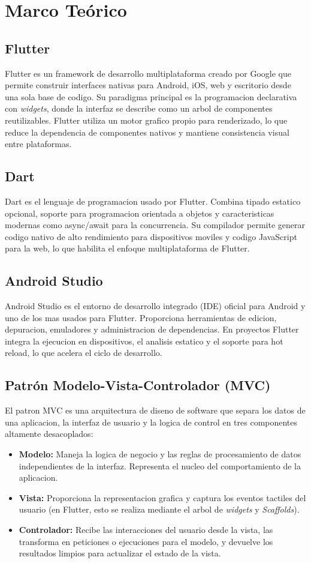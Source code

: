 \documentclass[12pt, a4paper]{article}
\begin{document}
\section{Marco Teórico}

\subsection{Flutter}
Flutter es un framework de desarrollo multiplataforma creado por Google que permite construir interfaces nativas para Android, iOS, web y escritorio desde una sola base de codigo. Su paradigma principal es la programacion declarativa con \textit{widgets}, donde la interfaz se describe como un arbol de componentes reutilizables. Flutter utiliza un motor grafico propio para renderizado, lo que reduce la dependencia de componentes nativos y mantiene consistencia visual entre plataformas.

\subsection{Dart}
Dart es el lenguaje de programacion usado por Flutter. Combina tipado estatico opcional, soporte para programacion orientada a objetos y caracteristicas modernas como async/await para la concurrencia. Su compilador permite generar codigo nativo de alto rendimiento para dispositivos moviles y codigo JavaScript para la web, lo que habilita el enfoque multiplataforma de Flutter.

\subsection{Android Studio}
Android Studio es el entorno de desarrollo integrado (IDE) oficial para Android y uno de los mas usados para Flutter. Proporciona herramientas de edicion, depuracion, emuladores y administracion de dependencias. En proyectos Flutter integra la ejecucion en dispositivos, el analisis estatico y el soporte para hot reload, lo que acelera el ciclo de desarrollo.

\subsection{Patrón Modelo-Vista-Controlador (MVC)}
El patron MVC es una arquitectura de diseno de software que separa los datos de una aplicacion, la interfaz de usuario y la logica de control en tres componentes altamente desacoplados:
\begin{itemize}
  \item \textbf{Modelo:} Maneja la logica de negocio y las reglas de procesamiento de datos independientes de la interfaz. Representa el nucleo del comportamiento de la aplicacion.
  \item \textbf{Vista:} Proporciona la representacion grafica y captura los eventos tactiles del usuario (en Flutter, esto se realiza mediante el arbol de \textit{widgets} y \textit{Scaffolds}).
  \item \textbf{Controlador:} Recibe las interacciones del usuario desde la vista, las transforma en peticiones o ejecuciones para el modelo, y devuelve los resultados limpios para actualizar el estado de la vista.
\end{itemize}
\end{document}
